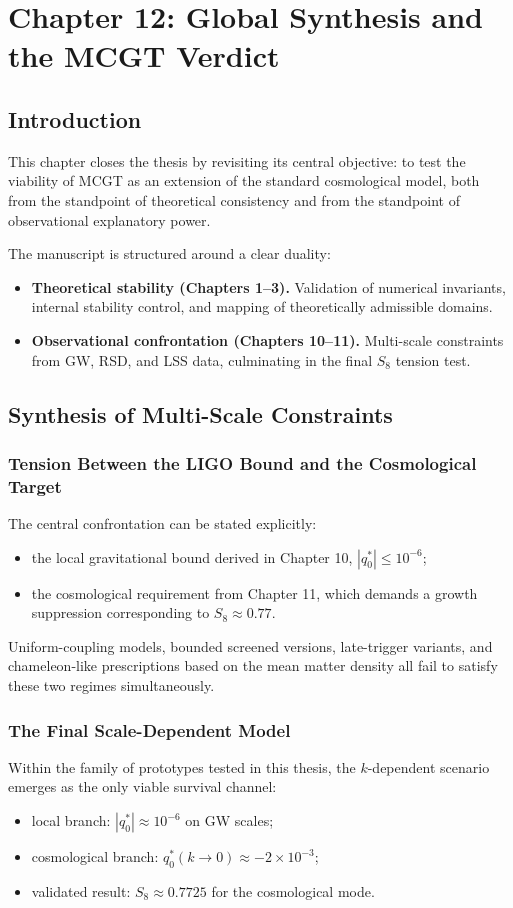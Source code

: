\section{Chapter 12: Global Synthesis and the MCGT Verdict}

\subsection{Introduction}
This chapter closes the thesis by revisiting its central objective: to test the viability of MCGT as an extension of the standard cosmological model, both from the standpoint of theoretical consistency and from the standpoint of observational explanatory power.

The manuscript is structured around a clear duality:
\begin{itemize}
    \item \textbf{Theoretical stability (Chapters 1--3).} Validation of numerical invariants, internal stability control, and mapping of theoretically admissible domains.
    \item \textbf{Observational confrontation (Chapters 10--11).} Multi-scale constraints from GW, RSD, and LSS data, culminating in the final $S_8$ tension test.
\end{itemize}

\subsection{Synthesis of Multi-Scale Constraints}
\subsubsection{Tension Between the LIGO Bound and the Cosmological Target}
The central confrontation can be stated explicitly:
\begin{itemize}
    \item the local gravitational bound derived in Chapter 10, $|q_0^*| \le 10^{-6}$;
    \item the cosmological requirement from Chapter 11, which demands a growth suppression corresponding to $S_8 \approx 0.77$.
\end{itemize}

Uniform-coupling models, bounded screened versions, late-trigger variants, and chameleon-like prescriptions based on the mean matter density all fail to satisfy these two regimes simultaneously.

\subsubsection{The Final Scale-Dependent Model}
Within the family of prototypes tested in this thesis, the $k$-dependent scenario emerges as the only viable survival channel:
\begin{itemize}
    \item local branch: $|q_0^*| \approx 10^{-6}$ on GW scales;
    \item cosmological branch: $q_0^*(k \rightarrow 0) \approx -2 \times 10^{-3}$;
    \item validated result: $S_8 \approx 0.7725$ for the cosmological mode.
\end{itemize}

